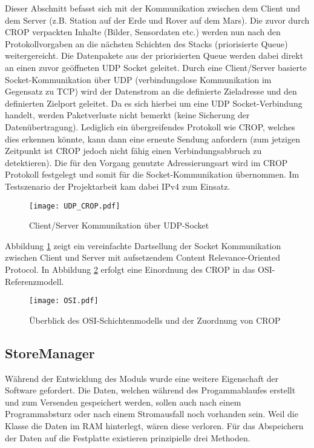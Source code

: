 
Dieser Abschnitt befasst sich mit der Kommunikation zwischen dem Client
und dem Server (z.B. Station auf der Erde und Rover auf dem Mars). Die zuvor
durch CROP verpackten Inhalte (Bilder, Sensordaten etc.) werden nun nach den
Protokollvorgaben an die n{\"a}chsten Schichten des Stacks (priorisierte Queue)
weitergereicht.
Die Datenpakete aus der priorisierten Queue werden dabei direkt an einen zuvor
ge{\"o}ffneten UDP Socket geleitet. Durch eine Client/Server basierte
Socket-Kommunikation {\"u}ber UDP (verbindungslose Kommunikation im Gegensatz
zu TCP) wird der Datenstrom an die definierte Zieladresse und den definierten
Zielport geleitet. Da es sich hierbei um eine UDP Socket-Verbindung handelt,
werden Paketverluste nicht bemerkt (keine Sicherung der Daten{\"u}bertragung).
Lediglich ein {\"u}bergreifendes Protokoll wie CROP, welches dies erkennen
k{\"o}nnte, kann dann eine erneute Sendung anfordern (zum jetzigen Zeitpunkt
ist CROP jedoch nicht f{\"a}hig einen Verbindungsabbruch zu detektieren). Die
f{\"u}r den Vorgang genutzte Adressierungsart wird im CROP Protokoll festgelegt
und somit f{\"u}r die Socket-Kommunikation {\"u}bernommen. Im Testszenario der
Projektarbeit kam dabei IPv4 zum Einsatz.

\begin{figure}[H]
\centering
\texttt{[image: UDP\_CROP.pdf]}
\caption{Client/Server Kommunikation {\"u}ber UDP-Socket}
\label{fig:Socket-Kommunikation}
\end{figure}

Abbildung \ref{fig:Socket-Kommunikation} zeigt ein vereinfachte Dartsellung der
Socket Kommunikation zwischen Client und Server mit aufsetzendem Content
Relevance-Oriented Protocol. In Abbildung \ref{fig:OSI} erfolgt eine Einordnung
des CROP in das OSI-Referenzmodell.

\begin{figure}[H]
\centering
\texttt{[image: OSI.pdf]}
\caption{{\"U}berblick des OSI-Schichtenmodells und der Zuordnung von CROP}
\label{fig:OSI}
\end{figure}



\subsection{StoreManager}

W{\"a}hrend der Entwicklung des Moduls  wurde eine weitere Eigenschaft
der Software gefordert.
Die Daten, welchen w{\"a}hrend des Progammablaufes erstellt und zum Versenden
gespeichert werden, sollen auch nach einem Programmabsturz oder nach einem
Stromausfall noch vorhanden sein. Weil die Klasse 
die Daten im RAM hinterlegt, w{\"a}ren diese verloren.
F{\"u}r das Abspeichern der Daten auf die Festplatte existieren prinzipielle drei Methoden.

